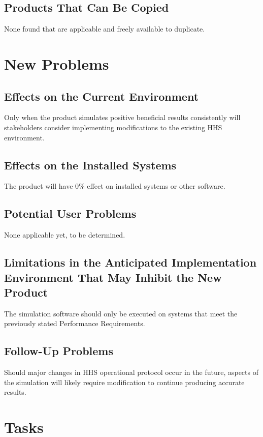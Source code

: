 \documentclass[paper=letter, fontsize=10pt]{scrartcl}
\numberwithin{equation}{section}		%
\numberwithin{figure}{section}			%
\numberwithin{table}{section}				%
\begin{document}
\subsection{Products That Can Be Copied}
None found that are applicable and freely available to duplicate.

\section{New Problems}
\subsection{Effects on the Current Environment}
Only when the product simulates positive beneficial results consistently will stakeholders consider implementing modifications to the existing HHS environment.
\subsection{Effects on the Installed Systems}
The product will have 0\% effect on installed systems or other software.
\subsection{Potential User Problems}
None applicable yet, to be determined.
\subsection{Limitations in the Anticipated Implementation Environment That May Inhibit the New Product}
The simulation software should only be executed on systems that meet the previously stated Performance Requirements.
\subsection{Follow-Up Problems}
Should major changes in HHS operational protocol occur in the future, aspects of the simulation will likely require modification to continue producing accurate results.

\section{Tasks}
\end{document}
